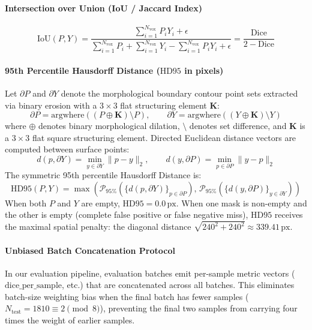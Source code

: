 \documentclass{article}
\begin{document}
\paragraph{Intersection over Union (IoU / Jaccard Index)}
\begin{equation}
    \text{IoU}(P, Y) = \frac{\sum_{i=1}^{N_{\text{vox}}} P_i Y_i + \epsilon}{\sum_{i=1}^{N_{\text{vox}}} P_i + \sum_{i=1}^{N_{\text{vox}}} Y_i - \sum_{i=1}^{N_{\text{vox}}} P_i Y_i + \epsilon} = \frac{\text{Dice}}{2 - \text{Dice}}
\end{equation}

\paragraph{95th Percentile Hausdorff Distance ($\text{HD95}$ in pixels)}
Let $\partial P$ and $\partial Y$ denote the morphological boundary contour point sets extracted via binary erosion with a $3 \times 3$ flat structuring element $\mathbf{K}$:
\begin{equation}
    \partial P = \text{argwhere}\left( (P \oplus \mathbf{K}) \setminus P \right), \qquad \partial Y = \text{argwhere}\left( (Y \oplus \mathbf{K}) \setminus Y \right)
\end{equation}
where $\oplus$ denotes binary morphological dilation, $\setminus$ denotes set difference, and $\mathbf{K}$ is a $3 \times 3$ flat square structuring element.
Directed Euclidean distance vectors are computed between surface points:
\begin{equation}
    d(p, \partial Y) = \min_{y \in \partial Y} \|p - y\|_2, \qquad d(y, \partial P) = \min_{p \in \partial P} \|y - p\|_2
\end{equation}
The symmetric 95th percentile Hausdorff Distance is:
\begin{equation}
    \text{HD95}(P, Y) = \max\left( \mathcal{P}_{95\%}\left( \{d(p, \partial Y)\}_{p \in \partial P} \right), \, \mathcal{P}_{95\%}\left( \{d(y, \partial P)\}_{y \in \partial Y} \right) \right)
\end{equation}
When both $P$ and $Y$ are empty, $\text{HD95} = 0.0\,\text{px}$. When one mask is non-empty and the other is empty (complete false positive or false negative miss), $\text{HD95}$ receives the maximal spatial penalty: the diagonal distance $\sqrt{240^2 + 240^2} \approx 339.41\,\text{px}$.

\paragraph{Unbiased Batch Concatenation Protocol}
In our evaluation pipeline, evaluation batches emit per-sample metric vectors ($\text{dice\_per\_sample}$, etc.) that are concatenated across all batches. This eliminates batch-size weighting bias when the final batch has fewer samples ($N_{\text{test}} = 1810 \equiv 2 \pmod 8$), preventing the final two samples from carrying four times the weight of earlier samples.
\end{document}
